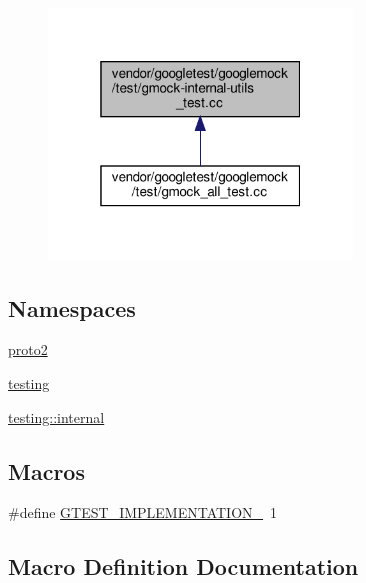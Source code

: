 \begin{figure}[H]
\begin{center}
\leavevmode
\includegraphics[width=229pt]{gmock-internal-utils__test_8cc__dep__incl}
\end{center}
\end{figure}
\subsection*{Namespaces}
\begin{DoxyCompactItemize}
\item 
 \hyperlink{namespaceproto2}{proto2}
\item 
 \hyperlink{namespacetesting}{testing}
\item 
 \hyperlink{namespacetesting_1_1internal}{testing\+::internal}
\end{DoxyCompactItemize}
\subsection*{Macros}
\begin{DoxyCompactItemize}
\item 
\#define \hyperlink{gmock-internal-utils__test_8cc_a83bd232fd1077579fada92c31bb7469f}{G\+T\+E\+S\+T\+\_\+\+I\+M\+P\+L\+E\+M\+E\+N\+T\+A\+T\+I\+O\+N\+\_\+}~1
\end{DoxyCompactItemize}


\subsection{Macro Definition Documentation}
\mbox{\label{gmock-internal-utils__test_8cc_a83bd232fd1077579fada92c31bb7469f}} 
